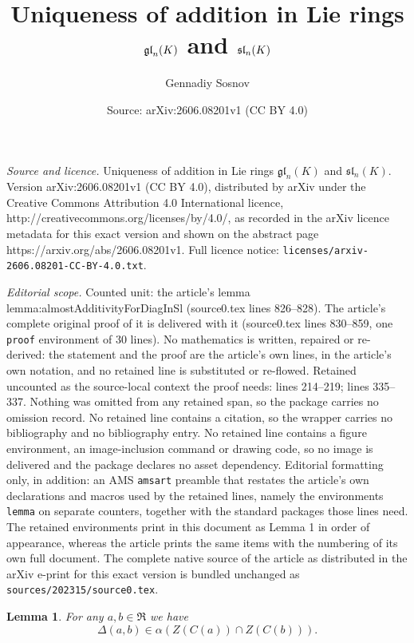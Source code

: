 \documentclass[10pt,a4paper]{amsart}
\title{Uniqueness of addition in Lie rings $\gl_n(K)$ and $\sl_n(K)$}
\author{Gennadiy Sosnov}
\date{Source: arXiv:2606.08201v1 (CC BY 4.0)}
\newtheorem{lemma}{Lemma}
\def\RRR{\mathfrak{R}}
\def\gl{\mathfrak{gl}}
\def\sl{\mathfrak{sl}}
\begin{document}
\maketitle

\noindent\emph{Source and licence.} Uniqueness of addition in Lie rings $\gl_n(K)$ and $\sl_n(K)$. Version arXiv:2606.08201v1 (CC BY 4.0), distributed by arXiv under the Creative Commons Attribution 4.0 International licence, http://creativecommons.org/licenses/by/4.0/, as recorded in the arXiv licence metadata for this exact version and shown on the abstract page https://arxiv.org/abs/2606.08201v1. Full licence notice: \texttt{licenses/arxiv-2606.08201-CC-BY-4.0.txt}.\par\smallskip

\noindent\textit{Editorial scope.} Counted unit: the article's lemma lemma:almostAdditivityForDiagInSl (source0.tex lines 826--828). The article's complete original proof of it is delivered with it (source0.tex lines 830--859, one \texttt{proof} environment of 30 lines). No mathematics is written, repaired or re-derived: the statement and the proof are the article's own lines, in the article's own notation, and no retained line is substituted or re-flowed.  Retained uncounted as the source-local context the proof needs: lines 214--219; lines 335--337.  Nothing was omitted from any retained span, so the package carries no omission record.  No retained line contains a citation, so the wrapper carries no bibliography and no bibliography entry.  No retained line contains a figure environment, an image-inclusion command or drawing code, so no image is delivered and the package declares no asset dependency.  Editorial formatting only, in addition: an AMS \texttt{amsart} preamble that restates the article's own declarations and macros used by the retained lines, namely the environments \texttt{lemma} on separate counters, together with the standard packages those lines need.  The retained environments print in this document as Lemma 1 in order of appearance, whereas the article prints the same items with the numbering of its own full document.  The complete native source of the article as distributed in the arXiv e-print for this exact version is bundled unchanged as \texttt{sources/202315/source0.tex}.
	\begin{lemma}\label{lemma:intersectionOfCenters}
		For any $a, b \in \RRR$ we have
		\begin{equation*}
			\Delta(a, b) \in \alpha(Z(C(a)) \cap Z(C(b))).
		\end{equation*}
	\end{lemma}
\end{document}
